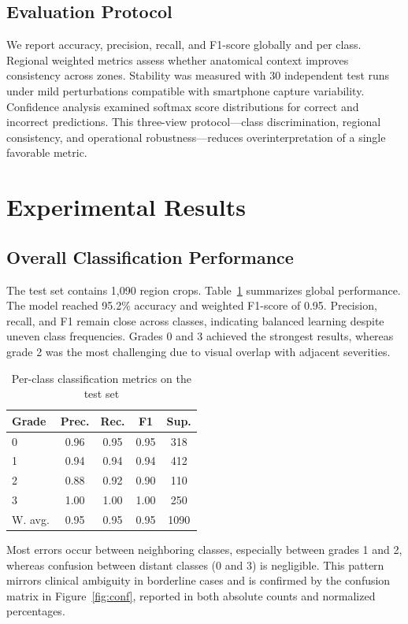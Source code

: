 \documentclass[10pt,conference]{IEEEtran}
\begin{document}
\subsection{Evaluation Protocol}
We report accuracy, precision, recall, and F1-score globally and per class. Regional weighted metrics assess whether anatomical context improves consistency across zones. Stability was measured with 30 independent test runs under mild perturbations compatible with smartphone capture variability. Confidence analysis examined softmax score distributions for correct and incorrect predictions. This three-view protocol---class discrimination, regional consistency, and operational robustness---reduces overinterpretation of a single favorable metric.

\section{Experimental Results}
\subsection{Overall Classification Performance}
The test set contains 1{,}090 region crops. Table~\ref{tab:class} summarizes global performance. The model reached 95.2\% accuracy and weighted F1-score of 0.95. Precision, recall, and F1 remain close across classes, indicating balanced learning despite uneven class frequencies. Grades 0 and 3 achieved the strongest results, whereas grade 2 was the most challenging due to visual overlap with adjacent severities.

\begin{table}[t]
\caption{Per-class classification metrics on the test set}
\label{tab:class}
\centering
\small
\begin{tabular}{lcccc}
\toprule
Grade & Prec. & Rec. & F1 & Sup. \\
\midrule
0 & 0.96 & 0.95 & 0.95 & 318 \\
1 & 0.94 & 0.94 & 0.94 & 412 \\
2 & 0.88 & 0.92 & 0.90 & 110 \\
3 & 1.00 & 1.00 & 1.00 & 250 \\
\midrule
W. avg. & 0.95 & 0.95 & 0.95 & 1090 \\
\bottomrule
\end{tabular}
\end{table}

Most errors occur between neighboring classes, especially between grades 1 and 2, whereas confusion between distant classes (0 and 3) is negligible. This pattern mirrors clinical ambiguity in borderline cases and is confirmed by the confusion matrix in Figure~\ref{fig:conf}, reported in both absolute counts and normalized percentages.
\end{document}
